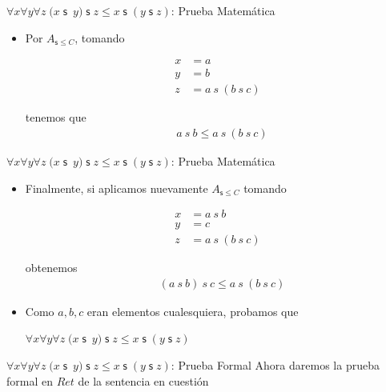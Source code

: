 \documentclass[10pt]{beamer}
\newcommand{\NsLesCot}{{A}_{\mathsf{s}\leq C}}
\newcommand{\assoc}{\forall x\forall y\forall
z\;(x\;\mathsf{s}$\ $y)\;\mathsf{s}\;z\leq x\;\mathsf{s}\;(y\;\mathsf{s}\;z)}
\begin{document}
\begin{frame}{$\assoc$: Prueba Matemática}
  \begin{itemize}[<+->]
    \item Por $\NsLesCot$, tomando
      \begin{center}
        \begin{align}
          x &= a \nonumber \\
          y &= b \nonumber \\
          z &= a\ s\ (b\ s\ c) \nonumber
        \end{align}
      \end{center}
      tenemos que
        \begin{align}
          &a\ s\ b  \leq a\ s\ (b\ s\ c) \label{eq7}
        \end{align}

  \end{itemize}
\end{frame}




\begin{frame}{$\assoc$: Prueba Matemática}
  \begin{itemize}[<+->]
    \item Finalmente, si aplicamos nuevamente $\NsLesCot$ tomando
    \begin{center}
      \begin{align}
        x &= a\ s\ b  \nonumber \\
        y &= c \nonumber \\
        z &= a\ s\ (b\ s\ c) \nonumber
      \end{align}

    \end{center}

     obtenemos
      \begin{align}
        &(a\ s\ b)\ s\ c  \leq a\ s\ (b\ s\ c) \label{eq7}
      \end{align}
    \item Como $a, b, c$ eran elementos cualesquiera, probamos que
      \begin{center}
        $\assoc$
      \end{center}

  \end{itemize}


\end{frame}



\begin{frame}{$\assoc$: Prueba Formal}
  Ahora daremos la prueba formal en $Ret$ de la sentencia en cuestión
\end{frame}
\end{document}
